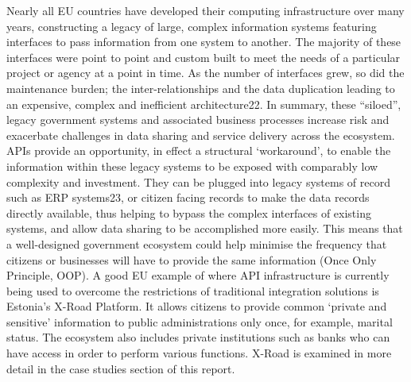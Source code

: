 Nearly all EU countries have developed their computing infrastructure over many years, constructing a
legacy of large, complex information systems featuring interfaces to pass information from one system to
another. The majority of these interfaces were point to point and custom built to meet the needs of a
particular project or agency at a point in time. As the number of interfaces grew, so did the maintenance
burden; the inter-relationships and the data duplication leading to an expensive, complex and inefficient
architecture22. In summary, these “siloed”, legacy government systems and associated business processes
increase risk and exacerbate challenges in data sharing and service delivery across the ecosystem.
APIs provide an opportunity, in effect a structural ‘workaround’, to enable the information within these
legacy systems to be exposed with comparably low complexity and investment. They can be plugged into
legacy systems of record such as ERP systems23, or citizen facing records to make the data records
directly available, thus helping to bypass the complex interfaces of existing systems, and allow data sharing
to be accomplished more easily. This means that a well-designed government ecosystem could help
minimise the frequency that citizens or businesses will have to provide the same information (Once Only
Principle, OOP).
A good EU example of where API infrastructure is currently being used to overcome the restrictions of
traditional integration solutions is Estonia’s X-Road Platform. It allows citizens to provide common ‘private
and sensitive’ information to public administrations only once, for example, marital status. The ecosystem
also includes private institutions such as banks who can have access in order to perform various functions.
X-Road is examined in more detail in the case studies section of this report.

